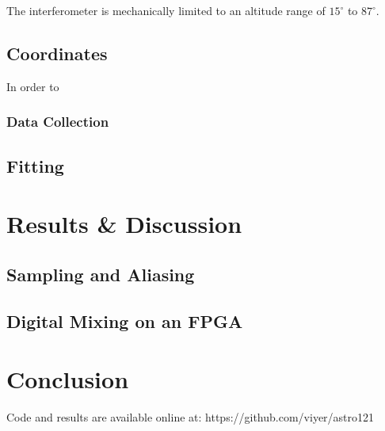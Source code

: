 \documentclass{article}
\begin{document}
    The interferometer is mechanically limited to an altitude range of
    $15^{\circ}$ to $87^{\circ}$.

  \subsection{Coordinates}
  In order to
  \subsubsection{Data Collection}
  \subsection{Fitting}


\section{Results \& Discussion}
  \subsection{Sampling and Aliasing}

  \subsection{Digital Mixing on an FPGA}

\section{Conclusion}

Code and results are available online at: https://github.com/viyer/astro121



\end{document}
